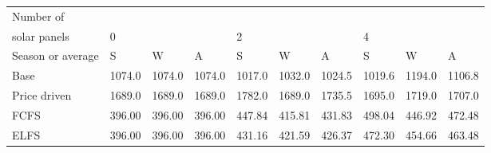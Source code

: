 \begin{table}[h] 
\centering 
\begin{tabular}{l|lll|lll|lll}Number of \\ solar panels&0& & &2& & &4& & \\ \hline 
Season or average & S & W & A & S & W & A & S & W & A \\ \hline 
Base&1074.0&1074.0&1074.0&1017.0&1032.0&1024.5&1019.6&1194.0&1106.8 \\ 
Price driven&1689.0&1689.0&1689.0&1782.0&1689.0&1735.5&1695.0&1719.0&1707.0 \\ 
FCFS&396.00&396.00&396.00&447.84&415.81&431.83&498.04&446.92&472.48 \\ 
ELFS&396.00&396.00&396.00&431.16&421.59&426.37&472.30&454.66&463.48 \\ 
\end{tabular} 
\end{table}